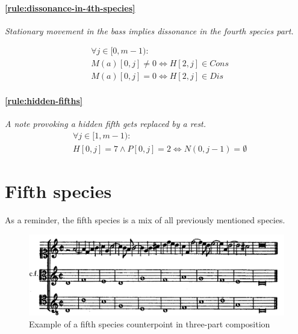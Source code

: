    \paragraph{\hspace{.6cm}\ref{rule:dissonance-in-4th-species}} \textit{Stationary movement in the bass implies dissonance in the fourth species part.}

    \begin{equation}
        \begin{aligned}
        &\forall j \in [0, m-1):\\
        &M(a)[0, j] \neq 0 \iff H[2, j] \in Cons\\
        &M(a)[0, j] = 0 \iff H[2, j] \in Dis
        \end{aligned}
    \end{equation}        


    \paragraph{\hspace{.6cm}\ref{rule:hidden-fifths}} \textit{A note provoking a hidden fifth gets replaced by a rest.}
    \begin{equation}
        \begin{aligned}
            &\forall j \in [1, m-1):\\
            &H[0, j] = 7 \land P[0,j] = 2 \iff N(0, j-1) = \emptyset  
        \end{aligned}
    \end{equation}



\section{Fifth species}

As a reminder, the fifth species is a mix of all previously mentioned species.

\begin{figure}[h]
    \centering
    \includegraphics[width=1\textwidth]{Images/Species_examples/5sp-example.png}
    \caption{Example of a fifth species counterpoint in three-part composition}
    \label{fig:example-5sp}
\end{figure}


